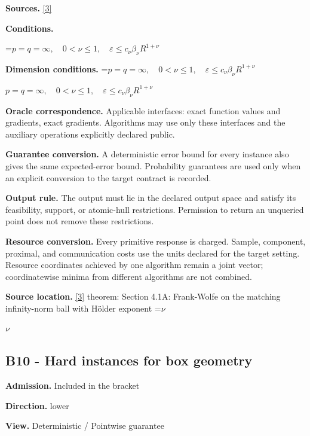 \documentclass[10pt,a4paper]{article}
\newcommand{\AtlasMath}[1]{\par\begingroup\centering\setbox0=\hbox{$\displaystyle #1$}\ifdim\wd0>1.4\linewidth\typeout{ATLAS WIDE FORMULA: \the\wd0}\fi\ifdim\wd0>\linewidth\resizebox{\linewidth}{!}{\box0}\else\box0\fi\par\endgroup}
\newcommand{\AtlasInlineMath}[1]{\begingroup\setbox0=\hbox{$#1$}\ifdim\wd0>.4\linewidth\endgroup\AtlasMath{#1}\else\endgroup$#1$\fi}
\begin{document}
\textbf{Sources.} \href{https://arxiv.org/pdf/1307.5001}{[3]}



\textbf{Conditions.}
\AtlasMath{p=q=\infty,\quad0<\nu\le1,\quad\varepsilon\le c_\nu\beta_\nu R^{1+\nu}}




\textbf{Dimension conditions.} \AtlasInlineMath{p=q=\infty,\quad0<\nu\le1,\quad\varepsilon\le c_\nu\beta_\nu R^{1+\nu}}



\textbf{Oracle correspondence.} Applicable interfaces: exact function values and gradients, exact gradients. Algorithms may use only these interfaces and the auxiliary operations explicitly declared public.



\textbf{Guarantee conversion.} A deterministic error bound for every instance also gives the same expected-error bound. Probability guarantees are used only when an explicit conversion to the target contract is recorded.



\textbf{Output rule.} The output must lie in the declared output space and satisfy its feasibility, support, or atomic-hull restrictions. Permission to return an unqueried point does not remove these restrictions.



\textbf{Resource conversion.} Every primitive response is charged. Sample, component, proximal, and communication costs use the units declared for the target setting. Resource coordinates achieved by one algorithm remain a joint vector; coordinatewise minima from different algorithms are not combined.



\textbf{Source location.} \href{https://arxiv.org/pdf/1307.5001}{[3]} theorem: Section 4.1A: Frank-Wolfe on the matching infinity-norm ball with Hölder exponent \AtlasInlineMath{\nu}



\subsection{B10 - Hard instances for box geometry}


\textbf{Admission.} Included in the bracket



\textbf{Direction.} lower



\textbf{View.} Deterministic / Pointwise guarantee
\end{document}
